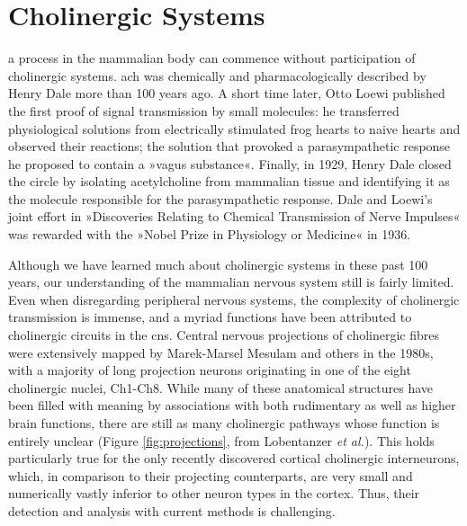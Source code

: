 \section{Cholinergic Systems}
 a process in the mammalian body can commence without participation of cholinergic systems. \Ac{ach} was chemically and pharmacologically described by Henry Dale more than 100 years ago.\cite{Dale1914} A short time later, Otto Loewi published the first proof of signal transmission by small molecules: he transferred physiological solutions from electrically stimulated frog hearts to naive hearts and observed their reactions; the solution that provoked a parasympathetic response he proposed to contain a »vagus substance«.\cite{Loewi1921} Finally, in 1929, Henry Dale closed the circle by isolating acetylcholine from mammalian tissue and identifying it as the molecule responsible for the parasympathetic response.\cite{Dale1929} Dale and Loewi's joint effort in »Discoveries Relating to Chemical Transmission of Nerve Impulses« was rewarded with the »Nobel Prize in Physiology or Medicine« in 1936.

Although we have learned much about cholinergic systems in these past 100 years, our understanding of the mammalian nervous system still is fairly limited. Even when disregarding peripheral nervous systems, the complexity of cholinergic transmission is immense, and a myriad functions have been attributed to cholinergic circuits in the \ac{cns}. Central nervous projections of cholinergic fibres were extensively mapped by Marek-Marsel Mesulam and others in the 1980s,\cite{Mesulam1984, Mesulam1988} with a majority of long projection neurons originating in one of the eight cholinergic nuclei, Ch1-Ch8. While many of these anatomical structures have been filled with meaning by associations with both rudimentary as well as higher brain functions, there are still as many cholinergic pathways whose function is entirely unclear (Figure \ref{fig:projections}, from Lobentanzer \emph{et al.}\cite{Lobentanzer2019a}). This holds particularly true for the only recently discovered cortical cholinergic interneurons, which, in comparison to their projecting counterparts, are very small and numerically vastly inferior to other neuron types in the cortex. Thus, their detection and analysis with current methods is challenging. 

